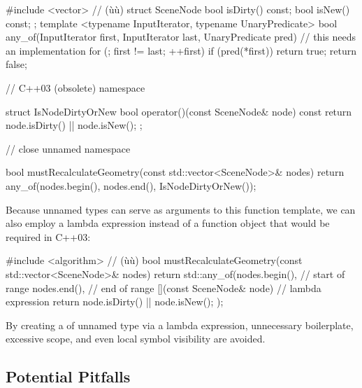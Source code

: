 \begin{emcppshiddenlisting}[emcppsbatch={e4,e5}]
#include <vector>     // (ù{}ù)
struct SceneNode {
    bool isDirty() const;
    bool isNew() const;
};
template <typename InputIterator, typename UnaryPredicate>
bool any_of(InputIterator first, InputIterator last, UnaryPredicate pred)
{
   // this needs an implementation
   for (; first != last; ++first) {
      if (pred(*first)) {
          return true;
      }
  }
  return false;
}
\end{emcppshiddenlisting}
\begin{emcppslisting}[emcppsbatch=e4]
// C++03 (obsolete)
namespace {

struct IsNodeDirtyOrNew
{
    bool operator()(const SceneNode& node) const
    {
        return node.isDirty() || node.isNew();
    }
};

}  // close unnamed namespace

bool mustRecalculateGeometry(const std::vector<SceneNode>& nodes)
{
    return any_of(nodes.begin(), nodes.end(), IsNodeDirtyOrNew());
}
\end{emcppslisting}

\noindent Because unnamed types can serve as arguments to this function template, we can also employ a lambda expression instead of a function object that would be required in C++03:

\begin{emcppslisting}[emcppsbatch=e5]
#include <algorithm> // (ù{}ù)
bool mustRecalculateGeometry(const std::vector<SceneNode>& nodes)
{
    return std::any_of(nodes.begin(),             // start of range
                       nodes.end(),               // end of range
                       [](const SceneNode& node)  // lambda expression
                       {
                           return node.isDirty() || node.isNew();
                       }
                      );
}
\end{emcppslisting}

\noindent By creating a  of unnamed type via a lambda
expression, unnecessary boilerplate, excessive scope, and even local
symbol visibility are avoided.

\subsection[Potential Pitfalls]{Potential Pitfalls}\label{potential-pitfalls}

\hspace{\fill}

